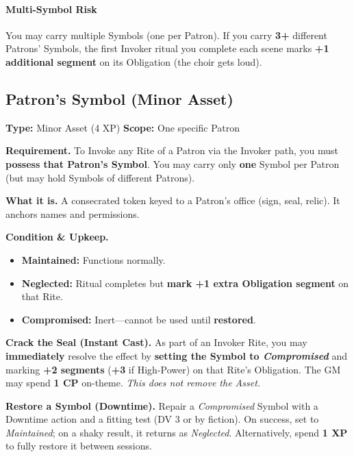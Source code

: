 \documentclass[12pt,twoside]{book}
\begin{document}
\paragraph{Multi-Symbol Risk}
You may carry multiple Symbols (one per Patron). If you carry \textbf{3+} different Patrons’ Symbols, the first Invoker ritual you complete each scene marks \textbf{+1 additional segment} on its Obligation (the choir gets loud).


\subsection*{Patron’s Symbol (Minor Asset)}

\textbf{Type:} Minor Asset (4 XP) \hfill \textbf{Scope:} One specific Patron

\textbf{Requirement.} To Invoke any Rite of a Patron via the Invoker path, you must \textbf{possess that Patron’s Symbol}. You may carry only \textbf{one} Symbol per Patron (but may hold Symbols of different Patrons).

\textbf{What it is.} A consecrated token keyed to a Patron’s office (sign, seal, relic). It anchors names and permissions.

\textbf{Condition \& Upkeep.}
\begin{itemize}
  \item \textbf{Maintained:} Functions normally.
  \item \textbf{Neglected:} Ritual completes but \textbf{mark +1 extra Obligation segment} on that Rite.
  \item \textbf{Compromised:} Inert—cannot be used until \textbf{restored}.
\end{itemize}

\textbf{Crack the Seal (Instant Cast).} As part of an Invoker Rite, you may \textbf{immediately} resolve the effect by \textbf{setting the Symbol to \emph{Compromised}} and marking \textbf{+2 segments} (\textbf{+3} if High-Power) on that Rite’s Obligation. The GM may spend \textbf{1 CP} on-theme. \emph{This does not remove the Asset.}

\textbf{Restore a Symbol (Downtime).} Repair a \emph{Compromised} Symbol with a Downtime action and a fitting test (DV 3 or by fiction). On success, set to \emph{Maintained}; on a shaky result, it returns as \emph{Neglected}. Alternatively, spend \textbf{1 XP} to fully restore it between sessions.
\end{document}
